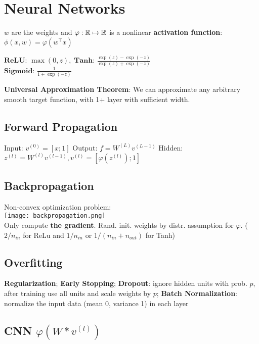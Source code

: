 \section*{Neural Networks}
$w$ are the weights and $\varphi: \mathbb{R} \mapsto \mathbb{R}$ is a nonlinear \textbf{activation function}: $\phi(x, w) = \varphi(w^\top x)$


$\textbf{ReLU: } \max (0,z), \; \textbf{Tanh: } \frac{\exp(z) - \exp(-z)}{\exp(z) + \exp(-z)}$ \\[-3pt]
$\textbf{Sigmoid: } \frac{1}{1 + \exp(-z)}$


\textbf{Universal Approximation Theorem}: We can approximate any arbitrary smooth target function, with 1+ layer with sufficient width.

\subsection*{Forward Propagation}

Input: $v^{(0)} = [x; 1]$ \quad Output: $f = W^{(L)} v^{(L-1)}$
Hidden: $z^{(l)} = W^{(l)} v^{(l-1)}, v^{(l)} = [\varphi(z^{(l)}); 1]$


\subsection*{Backpropagation}

Non-convex optimization problem: \\[-10pt]

\texttt{[image: backpropagation.png]} \\[-15pt]

Only compute \color{Red} \textbf{the gradient}\color{Black}. Rand. init. weights by distr. assumption for $\varphi$. ( $2 / n_{in}$ for ReLu and $1/n_{in}$ or $ 1/ (n_{in} + n_{out})$ for Tanh)

\subsection*{Overfitting}
\textbf{Regularization}; \textbf{Early Stopping}; \textbf{Dropout}: ignore hidden units with prob. $p$, after training use all units and scale weights by $p$; \textbf{Batch Normalization}: normalize the input data (mean 0, variance 1) in each layer

\subsection*{CNN \quad \color{Black}$\varphi(W * v^{(l)})$}

